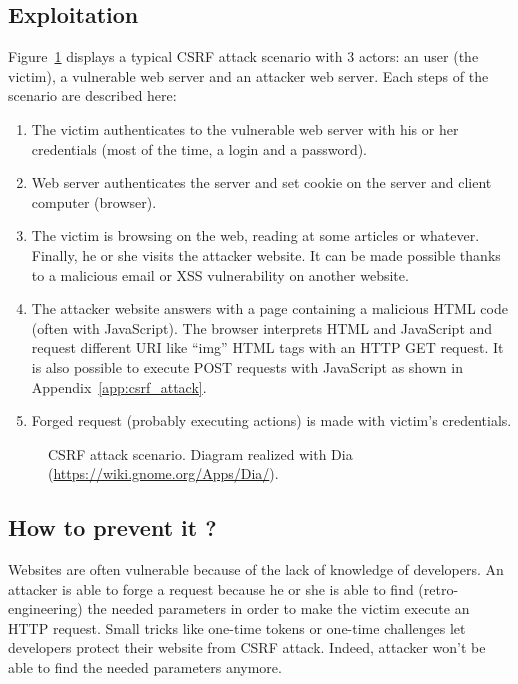 \documentclass[a4paper,11pt,openany]{report}
\begin{document}
  \subsection{Exploitation}
  Figure~\ref{figure:csrf_scenario} displays a typical CSRF attack scenario with 3 actors: an 
  user (the victim), a vulnerable web server and an attacker web server. Each steps of the 
  scenario are described here:
  \begin{enumerate}
   \item The victim authenticates to the vulnerable web server with his or her credentials (most 
   of the time, a login and a password).
   \item Web server authenticates the server and set cookie on the server and client computer 
   (browser).
   \item The victim is browsing on the web, reading at some articles or whatever. Finally, he or 
   she visits the attacker website. It can be made possible thanks to a malicious email or XSS 
   vulnerability on another website.
   \item The attacker website answers with a page containing a malicious HTML code (often with 
   JavaScript). The browser interprets HTML and JavaScript and request different URI like ``img'' 
   HTML tags with an HTTP GET request. It is also possible to execute POST requests with JavaScript 
   as shown in Appendix~\ref{app:csrf_attack}.
   \item Forged request (probably executing actions) is made with victim's credentials.
  \end{enumerate}
  
\begin{figure}[h!t]
  \begin{center}
    \caption{
      CSRF attack scenario. Diagram realized with Dia (\url{https://wiki.gnome.org/Apps/Dia/}).
    }
    \label{figure:csrf_scenario}
  \end{center}
\end{figure}
  
  \subsection{How to prevent it ?}
  Websites are often vulnerable because of the lack of knowledge of developers. An attacker is able 
  to forge a request because he or she is able to find (retro-engineering) the needed parameters in 
  order to make the victim execute an HTTP request. Small tricks like one-time tokens or one-time challenges let 
  developers protect their website from CSRF attack. Indeed, attacker won't be able to find the needed 
  parameters anymore.
  
\end{document}
